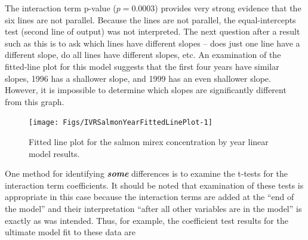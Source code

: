 \documentclass[10pt,openany]{book}\usepackage[]{graphicx}\usepackage[]{color}
\newenvironment{knitrout}{}{} %
\begin{document}
The interaction term p-value ($p=0.0003$) provides very strong evidence that the six lines are not parallel.  Because the lines are not parallel, the equal-intercepts test (second line of output) was not interpreted.  The next question after a result such as this is to ask which lines have different slopes -- does just one line have a different slope, do all lines have different slopes, etc.  An examination of the fitted-line plot for this model  suggests that the first four years have similar slopes, 1996 has a shallower slope, and 1999 has an even shallower slope.  However, it is impossible to determine which slopes are significantly different from this graph.

\begin{knitrout}
\color{fgcolor}\begin{figure}[h]

{\centering \texttt{[image: Figs/IVRSalmonYearFittedLinePlot-1]} 

}

\caption[Fitted line plot for the salmon mirex concentration by year linear model results]{Fitted line plot for the salmon mirex concentration by year linear model results.}\label{fig:IVRSalmonYearFittedLinePlot}
\end{figure}


\end{knitrout}

One method for identifying \textbf{\emph{some}} differences is to examine the t-tests for the interaction term coefficients.  It should be noted that examination of these tests is appropriate in this case because the interaction terms are added at the ``end of the model'' and their interpretation ``after all other variables are in the model'' is exactly as was intended.  Thus, for example, the coefficient test results for the ultimate model fit to these data are
\end{document}
